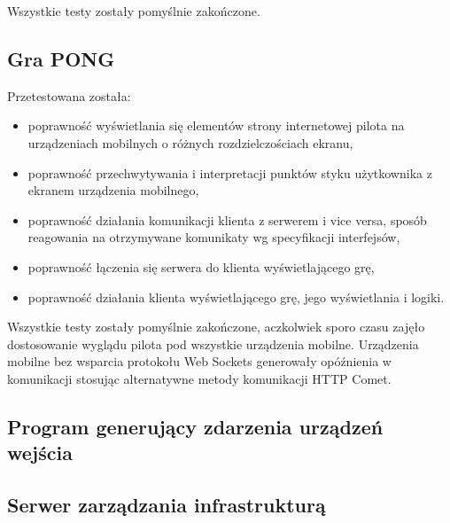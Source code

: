 Wszystkie testy zostały pomyślnie zakończone.

\subsection{Gra PONG}

Przetestowana została:

\begin{itemize}
	\item poprawność wyświetlania się elementów strony internetowej pilota na urządzeniach mobilnych o różnych rozdzielczościach ekranu,
	\item poprawność przechwytywania i interpretacji punktów styku użytkownika z ekranem urządzenia mobilnego,
	\item poprawność działania komunikacji klienta z serwerem i vice versa, sposób reagowania na otrzymywane komunikaty wg specyfikacji interfejsów,
	\item poprawność łączenia się serwera do klienta wyświetlającego grę,
	\item poprawność działania klienta wyświetlającego grę, jego wyświetlania i logiki.
\end{itemize}

Wszystkie testy zostały pomyślnie zakończone, aczkolwiek sporo czasu zajęło dostosowanie wyglądu pilota pod wszystkie urządzenia mobilne. Urządzenia mobilne bez wsparcia protokołu Web Sockets generowały opóźnienia w komunikacji stosując alternatywne metody komunikacji HTTP Comet.

\subsection{Program generujący zdarzenia urządzeń wejścia}

\subsection{Serwer zarządzania infrastrukturą}
